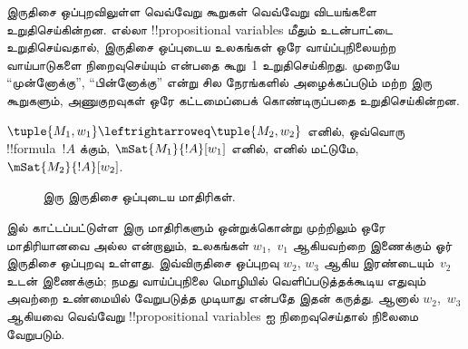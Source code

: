 \documentclass[../../../include/open-logic-section]{subfiles}
\begin{document}
இருதிசை ஒப்புறவிலுள்ள வெவ்வேறு கூறுகள் வெவ்வேறு விடயங்களை உறுதிசெய்கின்றன.
எல்லா !!{propositional variable}s மீதும் உடன்பாட்டை உறுதிசெய்வதால், இருதிசை
ஒப்புடைய உலகங்கள் ஒரே வாய்ப்புநிலையற்ற வாய்பாடுகளை நிறைவுசெய்யும் என்பதை
கூறு~1 உறுதிசெய்கிறது. முறையே ``முன்னோக்கு'', ``பின்னோக்கு'' என்று சில
நேரங்களில் அழைக்கப்படும் மற்ற இரு கூறுகளும், அணுகுறவுகள் ஒரே கட்டமைப்பைக்
கொண்டிருப்பதை உறுதிசெய்கின்றன.

\begin{thm}
$\tuple{M_1, w_1} \leftrightarroweq \tuple{M_2, w_2}$ எனில், ஒவ்வொரு
!!{formula}~$!A$ க்கும், $\mSat{M_1}{!A}[w_1]$ எனில், எனில் மட்டுமே,
$\mSat{M_2}{!A}[w_2]$.
\end{thm}

\begin{figure}
  \begin{center}
  \end{center}
  \caption{இரு இருதிசை ஒப்புடைய மாதிரிகள்.}
\end{figure}

 இல் காட்டப்பட்டுள்ள இரு மாதிரிகளும் ஒன்றுக்கொன்று
முற்றிலும் ஒரே மாதிரியானவை அல்ல என்றாலும், உலகங்கள் $w_1$,~$v_1$ ஆகியவற்றை
இணைக்கும் ஓர் இருதிசை ஒப்புறவு உள்ளது. இவ்விருதிசை ஒப்புறவு $w_2$, $w_3$
ஆகிய இரண்டையும்~$v_2$ உடன் இணைக்கும்; நமது வாய்ப்புநிலை மொழியில்
வெளிப்படுத்தக்கூடிய எதுவும் அவற்றை உண்மையில் வேறுபடுத்த முடியாது என்பதே இதன்
கருத்து. ஆனால் $w_2$,~$w_3$ ஆகியவை வெவ்வேறு !!{propositional variable}s ஐ
நிறைவுசெய்தால் நிலைமை வேறுபடும்.
\end{document}
